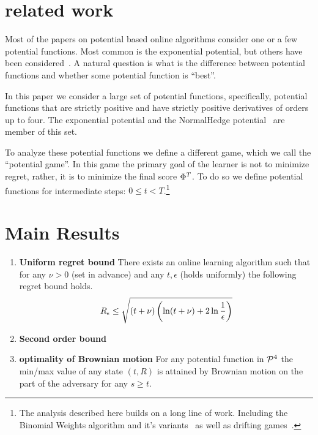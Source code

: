 \documentclass{article}[12pt]
\begin{document}
\section{related work}
Most of the papers on potential based online algorithms consider
one or a few potential functions. Most common is the exponential
potential, but others have been considered~\cite{cesa2006prediction}.
A natural question is what is the difference between potential
functions and whether some potential function is ``best''.

In this paper we consider a large set of potential functions,
specifically, potential functions that are strictly positive and have
strictly positive derivatives of orders up to four. The exponential
potential and the NormalHedge potential~\cite{chaudhuri2009parameter,luo2015achieving}
are member of this set. 

To analyze these potential functions we define a different
game, which we call the ``potential game''. In this game the primary
goal of the learner is not to minimize regret, rather, it is to
minimize the final score $\Phi^T$. To do so
we define potential functions for intermediate steps: $0 \leq t
<T$.\footnote{The analysis described here builds on a long line of
  work. Including the Binomial Weights algorithm and it's
  variants~\cite{cesa1996line,abernethy2006continuous,abernethy2008optimal}
  as well as drifting games~\cite{schapire2001drifting,freund2002drifting}.}


\section{Main Results}
\begin{enumerate}
\item {\bf Uniform regret bound} There exists an online learning
  algorithm such that for any $\nu>0$ (set in advance) and any
  $t,\epsilon$ (holds uniformly) the following regret bound holds.
  \begin{equation}
R_\epsilon \leq \sqrt{(t+\nu) \left( \ln (t+\nu) + 2 \ln \frac{1}{\epsilon}\right)}
\end{equation} 
\item {\bf Second order bound}
\item {\bf optimality of Brownian motion} For any potential function
  in ${\cal P}^{4}$ the min/max value of any state $(t,R)$ is attained by
  Brownian motion on the part of the adversary for any $s\geq t$.
\end{enumerate}
\end{document}
